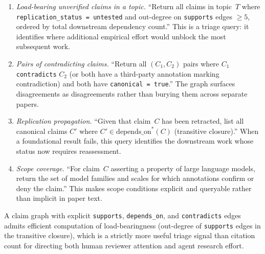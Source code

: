 \documentclass[11pt]{rrxiv}
\begin{document}
\begin{enumerate}[leftmargin=2em, itemsep=0.3em]

\item \emph{Load-bearing unverified claims in a topic.} ``Return all claims in topic~$T$ where \texttt{replication\_status = untested} and out-degree on \texttt{supports} edges $\geq 5$, ordered by total downstream dependency count.'' This is a triage query: it identifies where additional empirical effort would unblock the most subsequent work.

\item \emph{Pairs of contradicting claims.} ``Return all $(C_1, C_2)$ pairs where $C_1$ \texttt{contradicts} $C_2$ (or both have a third-party annotation marking contradiction) and both have \texttt{canonical = true}.'' The graph surfaces disagreements as disagreements rather than burying them across separate papers.

\item \emph{Replication propagation.} ``Given that claim~$C$ has been retracted, list all canonical claims $C'$ where $C' \in \mathrm{depends\_on}^*(C)$ (transitive closure).'' When a foundational result fails, this query identifies the downstream work whose status now requires reassessment.

\item \emph{Scope coverage.} ``For claim~$C$ asserting a property of large language models, return the set of model families and scales for which annotations confirm or deny the claim.'' This makes scope conditions explicit and queryable rather than implicit in paper text.

\end{enumerate}

\begin{claim}[title=Queryability of load-bearingness, type=theoretical, evidence=argument, labels={design-thesis}, confidence=0.6, rationale={Asserts strict superiority over citation count; plausible by construction but unmeasured at corpus scale}]
\label{claim:queryability}
A claim graph with explicit \texttt{supports}, \texttt{depends\_on}, and \texttt{contradicts} edges admits efficient computation of load-bearingness (out-degree of \texttt{supports} edges in the transitive closure), which is a strictly more useful triage signal than citation count for directing both human reviewer attention and agent research effort.
\end{claim}
\end{document}
